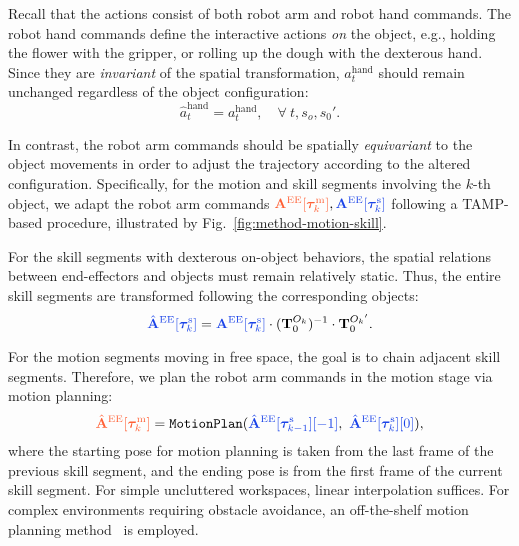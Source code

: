 Recall that the actions consist of both robot arm and robot hand commands. The robot hand commands define the interactive actions \textit{on} the object, e.g., holding the flower with the gripper, or rolling up the dough with the dexterous hand. Since they are \textit{invariant} of the spatial transformation, $a^{\mathrm{hand}}_t$ should remain unchanged regardless of the object configuration:
\begin{equation*}
    \hat{a}^{\mathrm{hand}}_t=a^{\mathrm{hand}}_t, \quad\forall~ t, s_o, s_0'.
\end{equation*}

In contrast, the robot arm commands should be spatially \textit{equivariant} to the object movements in order to adjust the trajectory according to the altered configuration.
Specifically, for the motion and skill segments involving the $k$-th object, we adapt the robot arm commands $\textcolor{myorange}{\mathbf{A}^\mathrm{EE}[{\bm{\tau}^{\mathrm{m}}_k}]}, \textcolor{myblue}{\mathbf{A}^\mathrm{EE}[{\bm{\tau}^{\mathrm{s}}_k}]}$ following a TAMP-based procedure, illustrated by Fig.~\ref{fig:method-motion-skill}.

For the skill segments with dexterous on-object behaviors, the spatial relations between end-effectors and objects must remain relatively static. Thus, the entire skill segments are transformed following the corresponding objects:
\begin{equation*}
    \textcolor{myblue}{\hat{\mathbf{A}}^\mathrm{EE}[{\bm{\tau}^{\mathrm{s}}_k}]}=\textcolor{myblue}{\mathbf{A}^\mathrm{EE}[{\bm{\tau}^{\mathrm{s}}_k}]} \cdot (\mathbf{T}_0^{{O_k}})^{-1} \cdot \mathbf{T}_0^{{O_k}'}.
\end{equation*}

For the motion segments moving in free space, the goal is to chain adjacent skill segments. Therefore, we plan the robot arm commands in the motion stage via motion planning:
\begin{equation*}
    \textcolor{myorange}{\hat{\mathbf{A}}^\mathrm{EE}[{\bm{\tau}^{\mathrm{m}}_k}]}=\texttt{MotionPlan}(\textcolor{myblue}{\hat{\mathbf{A}}^\mathrm{EE}[{\bm{\tau}^{\mathrm{s}}_{k-1}}][-1]},~ \textcolor{myblue}{\hat{\mathbf{A}}^\mathrm{EE}[{\bm{\tau}^{\mathrm{s}}_k}][0]}),
\end{equation*}
where the starting pose for motion planning is taken from the last frame of the previous skill segment, and the ending pose is from the first frame of the current skill segment. For simple uncluttered workspaces, linear interpolation suffices. For complex environments requiring obstacle avoidance, an off-the-shelf motion planning method~\cite{kuffner2000rrt} is employed.




